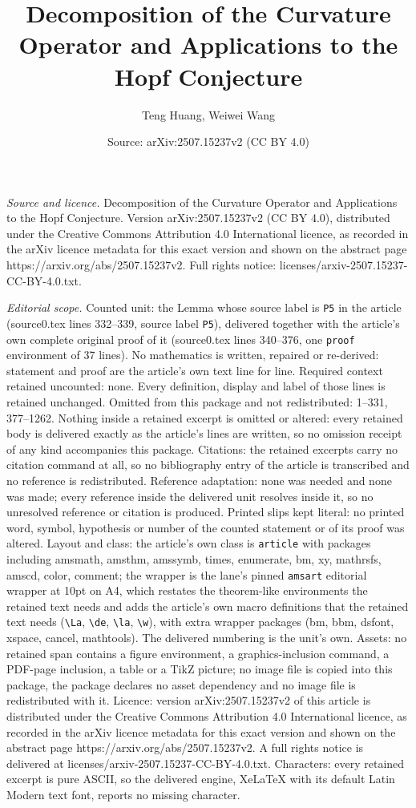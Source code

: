 \documentclass[10pt,a4paper]{amsart}
\title[Decomposition of the Curvature Operator and Applications to ]{Decomposition of the Curvature Operator and Applications to the Hopf Conjecture}
\author{Teng Huang, Weiwei Wang}
\date{Source: arXiv:2507.15237v2 (CC BY 4.0)}
\begin{document}
\maketitle

\noindent\emph{Source and licence.} Decomposition of the Curvature Operator and Applications to the Hopf Conjecture. Version arXiv:2507.15237v2 (CC BY 4.0), distributed under the Creative Commons Attribution 4.0 International licence, as recorded in the arXiv licence metadata for this exact version and shown on the abstract page https://arxiv.org/abs/2507.15237v2. Full rights notice: licenses/arxiv-2507.15237-CC-BY-4.0.txt.\par\smallskip

\noindent\textit{Editorial scope.} Counted unit: the Lemma whose source label is \texttt{P5} in the article (source0.tex lines 332--339, source label \texttt{P5}), delivered together with the article's own complete original proof of it (source0.tex lines 340--376, one \texttt{proof} environment of 37 lines). No mathematics is written, repaired or re-derived: statement and proof are the article's own text line for line. Required context retained uncounted: none. Every definition, display and label of those lines is retained unchanged. Omitted from this package and not redistributed: 1--331, 377--1262. Nothing inside a retained excerpt is omitted or altered: every retained body is delivered exactly as the article's lines are written, so no omission receipt of any kind accompanies this package. Citations: the retained excerpts carry no citation command at all, so no bibliography entry of the article is transcribed and no reference is redistributed. Reference adaptation: none was needed and none was made; every reference inside the delivered unit resolves inside it, so no unresolved reference or citation is produced. Printed slips kept literal: no printed word, symbol, hypothesis or number of the counted statement or of its proof was altered. Layout and class: the article's own class is \texttt{article} with packages including amsmath, amsthm, amssymb, times, enumerate, bm, xy, mathrsfs, amscd, color, comment; the wrapper is the lane's pinned \texttt{amsart} editorial wrapper at 10pt on A4, which restates the theorem-like environments the retained text needs and adds the article's own macro definitions that the retained text needs (\texttt{\textbackslash La}, \texttt{\textbackslash de}, \texttt{\textbackslash la}, \texttt{\textbackslash w}), with extra wrapper packages (bm, bbm, dsfont, xspace, cancel, mathtools). The delivered numbering is the unit's own. Assets: no retained span contains a figure environment, a graphics-inclusion command, a PDF-page inclusion, a table or a TikZ picture; no image file is copied into this package, the package declares no asset dependency and no image file is redistributed with it. Licence: version arXiv:2507.15237v2 of this article is distributed under the Creative Commons Attribution 4.0 International licence, as recorded in the arXiv licence metadata for this exact version and shown on the abstract page https://arxiv.org/abs/2507.15237v2. A full rights notice is delivered at licenses/arxiv-2507.15237-CC-BY-4.0.txt. Characters: every retained excerpt is pure ASCII, so the delivered engine, XeLaTeX with its default Latin Modern text font, reports no missing character.
\end{document}
